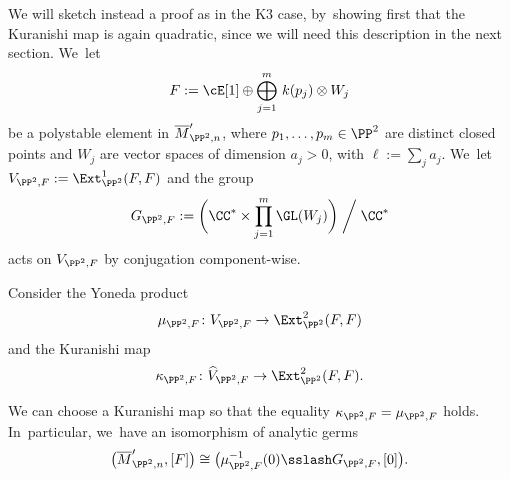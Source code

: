 We will sketch instead a proof as in the K3 case, by~showing first that the Kuranishi map is again quadratic, since we will need this description in the next section. We~let
\[
F:=\cE[1]\oplus \bigoplus_{j=1}^m\, k(p_j)\otimes W_j
\]
be a polystable element in $\overline{M}_{\PP^2,n}'$, where $p_1,\dots,p_m\in \PP^2$ are distinct closed points and $W_j$ are vector spaces of dimension $a_j>0$, with $\ell:=\sum_j a_j$. We~let $V_{\PP^2,F}:=\Ext^1_{\PP^2}(F,F)$ and the group
\begin{equation}\label{eq:groupP^2}
G_{\PP^2,F}:=\biggl(\CC^*\times \prod_{j=1}^m\GL(W_j)\biggr)\biggm/\CC^*
\end{equation}
acts on $V_{\PP^2,F}$ by conjugation component-wise.

Consider the Yoneda product
\[
\mu_{\PP^2,F}\colon V_{\PP^2,F} \to \Ext^2_{\PP^2}(F,F)
\]
and the Kuranishi map
\[
\kappa_{\PP^2,F}\colon \widehat{V}_{\PP^2,F} \to \Ext^2_{\PP^2}(F,F).
\]

\begin{lemm}\label{lem:KuranishiP2}
We can choose a Kuranishi map so that the equality $\kappa_{\PP^2,F}=\mu_{\PP^2,F}$ holds. In~particular, we~have an isomorphism of analytic germs
\[
\bigl(\overline{M}_{\PP^2,n}',[F]\bigr)\cong \bigl(\mu_{\PP^2,F}^{-1}(0)\sslash G_{\PP^2,F},[0]\bigr).
\]
\end{lemm}

